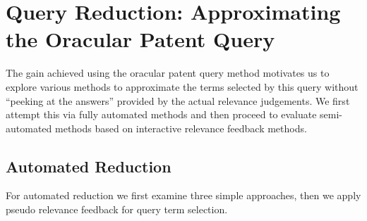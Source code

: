 \section{Query Reduction: Approximating the Oracular Patent Query}
\label{sec: QR}
The gain achieved using the oracular patent query method motivates us to explore various methods to approximate the terms
selected by this query without ``peeking at the answers'' provided by
the actual relevance judgements.  We first attempt this via fully
automated methods and then proceed to evaluate semi-automated methods
based on interactive relevance feedback methods.
\subsection{Automated Reduction}
\label{AutomatedReduction}
For automated reduction we first examine three simple approaches, then we apply pseudo relevance feedback for query term selection.  
